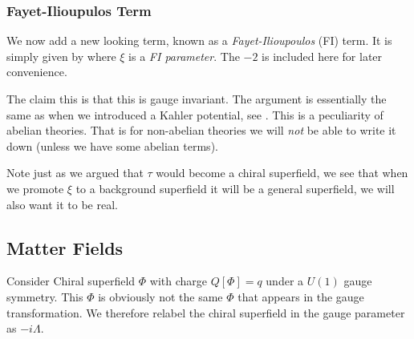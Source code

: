 \subsubsection{Fayet-Ilioupulos Term}

We now add a new looking term, known as a \textit{Fayet-Ilioupoulos} (FI) term. It is simply given by 
\noindent where $\xi$ is a \textit{FI parameter}. The $-2$ is included here for later convenience. 

The claim this is that this is gauge invariant. The argument is essentially the same as when we introduced a Kahler potential, see . This is a peculiarity of abelian theories. That is for non-abelian theories we will \textit{not} be able to write it down (unless we have some abelian terms). 

Note just as we argued that $\tau$ would become a chiral superfield, we see that when we promote $\xi$ to a background superfield it will be a general superfield, we will also want it to be real.

\subsection{Matter Fields}

Consider Chiral superfield $\Phi$ with charge $Q[\Phi] = q$ under a $U(1)$ gauge symmetry. This $\Phi$ is obviously not the same $\Phi$ that appears in the gauge transformation. We therefore relabel the chiral superfield in the gauge parameter as $-i\Lambda$. 

